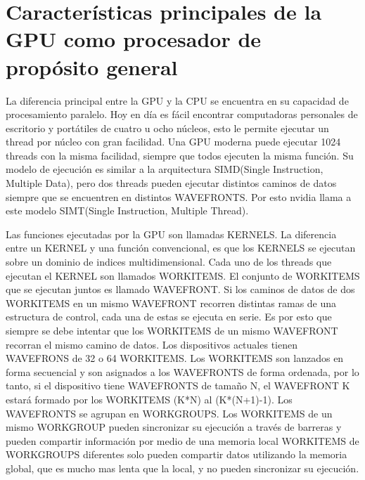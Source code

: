 
\chapter{Características principales de la GPU como procesador de propósito
general}

La diferencia principal entre la GPU y la CPU se encuentra en su capacidad de
procesamiento paralelo. Hoy en día es fácil encontrar computadoras personales de
escritorio y portátiles de cuatro u ocho núcleos, esto le permite ejecutar un
thread por núcleo con gran facilidad. Una GPU moderna puede ejecutar 1024 threads
con la misma facilidad, siempre que todos ejecuten la misma función. Su modelo de
ejecución es similar a la arquitectura SIMD(Single Instruction, Multiple Data),
pero dos threads pueden ejecutar distintos caminos de datos siempre que se
encuentren en distintos WAVEFRONTS. Por esto nvidia llama a este modelo
SIMT(Single Instruction, Multiple Thread).

Las funciones ejecutadas por la GPU son llamadas KERNELS. La diferencia entre un
KERNEL y una función convencional, es que los KERNELS se ejecutan sobre un
dominio de indices multidimensional. Cada uno de los threads que ejecutan el
KERNEL son llamados WORKITEMS. El conjunto de WORKITEMS que se ejecutan juntos es
llamado WAVEFRONT. Si los caminos de datos de dos WORKITEMS en un mismo WAVEFRONT
recorren distintas ramas de una estructura de control, cada una de estas se
ejecuta en serie. Es por esto que siempre se debe intentar que los WORKITEMS de
un mismo WAVEFRONT recorran el mismo camino de datos. Los dispositivos actuales
tienen WAVEFRONS de 32 o 64 WORKITEMS. Los WORKITEMS son lanzados en forma
secuencial y son asignados a los WAVEFRONTS de forma ordenada, por lo tanto, si
el dispositivo tiene WAVEFRONTS de tamaño N, el WAVEFRONT K estará formado por
los WORKITEMS (K*N) al (K*(N+1)-1). Los WAVEFRONTS se agrupan en WORKGROUPS. Los
WORKITEMS de un mismo WORKGROUP pueden sincronizar su ejecución a través de
barreras y pueden compartir información por medio de una memoria local WORKITEMS
de WORKGROUPS diferentes solo pueden compartir datos utilizando la memoria
global, que es mucho mas lenta que la local, y no pueden sincronizar su
ejecución.

